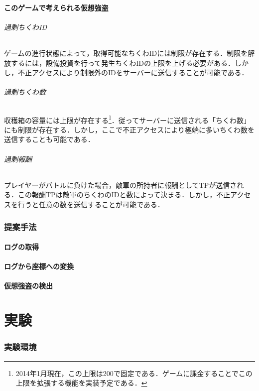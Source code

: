 \documentclass[a4paper,11pt]{jsarticle}
\begin{document}
\subsection{このゲームで考えられる仮想強盗}
\paragraph{過剰ちくわID}
ゲームの進行状態によって，取得可能なちくわIDには制限が存在する．制限を解放するには，設備投資を行って発生ちくわIDの上限を上げる必要がある．しかし，不正アクセスにより制限外のIDをサーバーに送信することが可能である．

\paragraph{過剰ちくわ数}
収穫箱の容量には上限が存在する\footnote{2014年1月現在，この上限は200で固定である．ゲームに課金することでこの上限を拡張する機能を実装予定である．}．従ってサーバーに送信される「ちくわ数」にも制限が存在する．しかし，ここで不正アクセスにより極端に多いちくわ数を送信することも可能である．

\paragraph{過剰報酬}
プレイヤーがバトルに負けた場合，敵軍の所持者に報酬としてTPが送信される．この報酬TPは敵軍のちくわのIDと数によって決まる．しかし，不正アクセスを行うと任意の数を送信することが可能である．

\section{提案手法}
\subsection{ログの取得}
\subsection{ログから座標への変換}
\subsection{仮想強盗の検出}

\newpage
\part{実験}
\section{実験環境}
\end{document}

